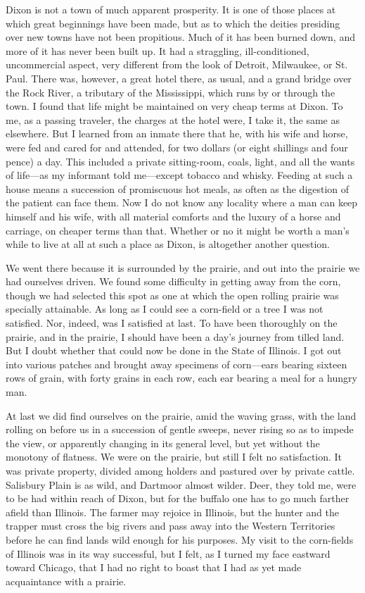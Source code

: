 Dixon is not a town of much apparent prosperity.  It is one of
those places at which great beginnings have been made, but as to
which the deities presiding over new towns have not been
propitious.  Much of it has been burned down, and more of it has
never been built up.  It had a straggling, ill-conditioned,
uncommercial aspect, very different from the look of Detroit,
Milwaukee, or St. Paul.  There was, however, a great hotel there,
as usual, and a grand bridge over the Rock River, a tributary of
the Mississippi, which runs by or through the town.  I found that
life might be maintained on very cheap terms at Dixon.  To me, as a
passing traveler, the charges at the hotel were, I take it, the
same as elsewhere.  But I learned from an inmate there that he,
with his wife and horse, were fed and cared for and attended, for
two dollars (or eight shillings and four pence) a day.  This
included a private sitting-room, coals, light, and all the wants of
life---as my informant told me---except tobacco and whisky.  Feeding
at such a house means a succession of promiscuous hot meals, as
often as the digestion of the patient can face them.  Now I do not
know any locality where a man can keep himself and his wife, with
all material comforts and the luxury of a horse and carriage, on
cheaper terms than that.  Whether or no it might be worth a man's
while to live at all at such a place as Dixon, is altogether
another question.

We went there because it is surrounded by the prairie, and out into
the prairie we had ourselves driven.  We found some difficulty in
getting away from the corn, though we had selected this spot as one
at which the open rolling prairie was specially attainable.  As
long as I could see a corn-field or a tree I was not satisfied.
Nor, indeed, was I satisfied at last.  To have been thoroughly on
the prairie, and in the prairie, I should have been a day's journey
from tilled land.  But I doubt whether that could now be done in
the State of Illinois.  I got out into various patches and brought
away specimens of corn---ears bearing sixteen rows of grain, with
forty grains in each row, each ear bearing a meal for a hungry man.

At last we did find ourselves on the prairie, amid the waving
grass, with the land rolling on before us in a succession of gentle
sweeps, never rising so as to impede the view, or apparently
changing in its general level, but yet without the monotony of
flatness.  We were on the prairie, but still I felt no
satisfaction.  It was private property, divided among holders and
pastured over by private cattle.  Salisbury Plain is as wild, and
Dartmoor almost wilder.  Deer, they told me, were to be had within
reach of Dixon, but for the buffalo one has to go much farther
afield than Illinois.  The farmer may rejoice in Illinois, but the
hunter and the trapper must cross the big rivers and pass away into
the Western Territories before he can find lands wild enough for
his purposes.  My visit to the corn-fields of Illinois was in its
way successful, but I felt, as I turned my face eastward toward
Chicago, that I had no right to boast that I had as yet made
acquaintance with a prairie.


